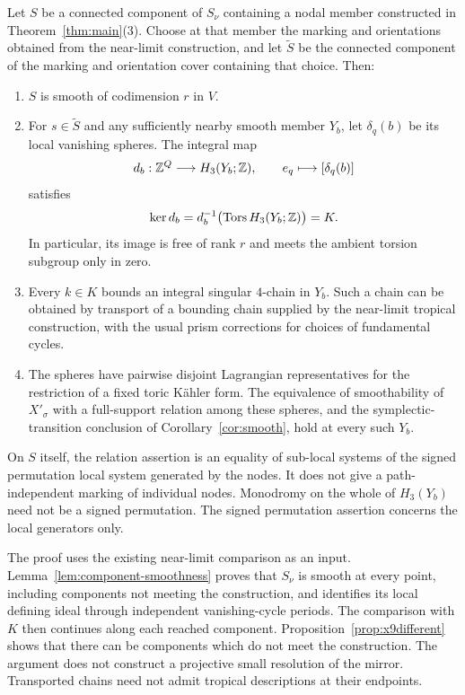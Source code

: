 \begin{proposition}\label{prop:componentwise}
Let $S$ be a connected component of $S_\nu$ containing a nodal member
constructed in Theorem~\ref{thm:main}(3). Choose at that member the marking
and orientations obtained from the near-limit construction, and let
$\widetilde S$ be the connected component of the marking and orientation
cover containing that choice. Then:
\begin{enumerate}
\item $S$ is smooth of codimension $r$ in $V$.
\item For $s\in\widetilde S$ and any sufficiently nearby smooth member
  $Y_b$, let $\delta_q(b)$ be its local vanishing spheres. The integral map
  \[
   d_b:\mathbb Z^Q\longrightarrow H_3(Y_b;\mathbb Z),\qquad
   e_q\longmapsto[\delta_q(b)]
  \]
  satisfies
  \[
   \ker d_b=d_b^{-1}\bigl(\operatorname{Tors} H_3(Y_b;\mathbb Z)\bigr)=K.
  \]
  In particular, its image is free of rank $r$ and meets the ambient
  torsion subgroup only in zero.
\item Every $k\in K$ bounds an integral singular $4$-chain in $Y_b$.
  Such a chain can be obtained by transport of a bounding chain supplied
  by the near-limit tropical construction, with the usual prism
  corrections for choices of fundamental cycles.
\item The spheres have pairwise disjoint Lagrangian representatives for
  the restriction of a fixed toric K\"ahler form. The equivalence of
  smoothability of $X'_\sigma$ with a full-support relation among these
  spheres, and the symplectic-transition conclusion of Corollary~\ref{cor:smooth}, hold at every such $Y_b$.
\end{enumerate}
\end{proposition}

On $S$ itself, the relation assertion is an equality of sub-local systems
of the signed permutation local system generated by the nodes. It does
not give a path-independent marking of individual nodes. Monodromy on
the whole of $H_3(Y_b)$ need not be a signed permutation. The signed
permutation assertion concerns the local generators only.

The proof uses the existing near-limit comparison as an input.
Lemma~\ref{lem:component-smoothness} proves that $S_\nu$ is smooth at every point,
including components not meeting the construction, and identifies its
local defining ideal through independent vanishing-cycle periods.
The comparison with $K$ then continues along each reached component.
Proposition~\ref{prop:x9different} shows that there can be components
which do not meet the construction. The argument does not construct a projective small resolution of
the mirror. Transported chains need not admit tropical descriptions at
their endpoints.

